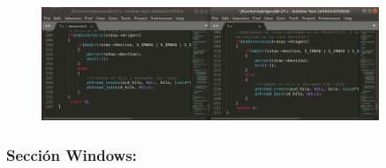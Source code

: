 \documentclass[12pt]{article}
\begin{document}
\begin{itemize}
			         \begin{figure}[h!]
			          \centering \includegraphics[width=0.9\textwidth]{Practica5/Images/linux/7_13.png}
			         \end{figure}
	
	\end{itemize}		 
			 
			 
	        
\newpage
		    \subsubsection{Sección Windows:}
		    
\end{document}
